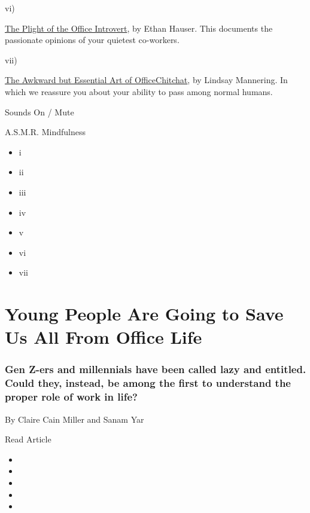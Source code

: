 vi)

\protect\hyperlink{elev6}{The Plight of the Office Introvert}, by Ethan
Hauser. This documents the passionate opinions of your quietest
co-workers.

vii)

\protect\hyperlink{elev7}{The Awkward but Essential Art of
Office}\protect\hyperlink{elev7}{Chitchat}, by Lindsay Mannering. In
which we reassure you about your ability to pass among normal humans.

Sounds On / Mute

A.S.M.R. Mindfulness

\begin{itemize}
\item
  i
\item
  ii
\item
  iii
\item
  iv
\item
  v
\item
  vi
\item
  vii
\end{itemize}

\href{https://www.nytimes.com/2019/09/17/style/generation-z-millennials-work-life-balance.html}{}

\hypertarget{young-people-are-going-to-save-us-all-from-office-life}{%
\section{Young People Are Going to Save Us All From Office
Life}\label{young-people-are-going-to-save-us-all-from-office-life}}

\hypertarget{gen-z-ers-and-millennials-have-been-called-lazy-and-entitled-could-they-instead-be-among-the-first-to-understand-the-proper-role-of-work-in-life}{%
\subsubsection{Gen Z-ers and millennials have been called lazy and
entitled. Could they, instead, be among the first to understand the
proper role of work in
life?}\label{gen-z-ers-and-millennials-have-been-called-lazy-and-entitled-could-they-instead-be-among-the-first-to-understand-the-proper-role-of-work-in-life}}

By Claire Cain Miller and Sanam Yar

Read Article

\begin{itemize}
\item
\item
\item
\item
\item
\end{itemize}

